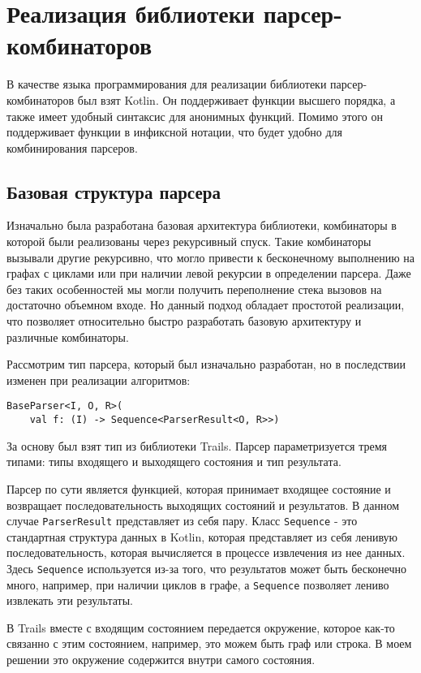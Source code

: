 \chapter{Реализация библиотеки парсер-комбинаторов}
\label{ch:ch3}

В качестве языка программирования для реализации библиотеки парсер-комбинаторов был взят Kotlin.
Он поддерживает функции высшего порядка, а также имеет удобный синтаксис для анонимных функций.
Помимо этого он поддерживает функции в инфиксной нотации, что будет удобно для комбинирования парсеров.


\section{Базовая структура парсера}

Изначально была разработана базовая архитектура библиотеки, комбинаторы в которой были реализованы через рекурсивный спуск.
Такие комбинаторы вызывали другие рекурсивно, что могло привести к бесконечному выполнению на графах с циклами или при наличии левой рекурсии в определении парсера.
Даже без таких особенностей мы могли получить переполнение стека вызовов на достаточно объемном входе.
Но данный подход обладает простотой реализации, что позволяет относительно быстро разработать базовую архитектуру и различные комбинаторы.

Рассмотрим тип парсера, который был изначально разработан, но в последствии изменен при реализации алгоритмов:
\begin{lstlisting}
BaseParser<I, O, R>(
    val f: (I) -> Sequence<ParserResult<O, R>>)
\end{lstlisting}
За основу был взят тип из библиотеки Trails. Парсер параметризуется тремя типами: типы входящего и выходящего состояния и тип результата.

Парсер по сути является функцией, которая принимает входящее состояние и возвращает последовательность выходящих состояний и результатов. В данном случае \verb|ParserResult| представляет из себя пару. Класс \verb|Sequence| - это стандартная структура данных в Kotlin, которая представляет из себя ленивую последовательность, которая вычисляется в процессе извлечения из нее данных. Здесь \verb|Sequence| используется из-за того, что результатов может быть бесконечно много, например, при наличии циклов в графе, а \verb|Sequence| позволяет лениво извлекать эти результаты.

В Trails вместе с входящим состоянием передается окружение, которое как-то связанно с этим состоянием, например, это можем быть граф или строка. В моем решении это окружение содержится внутри самого состояния.

